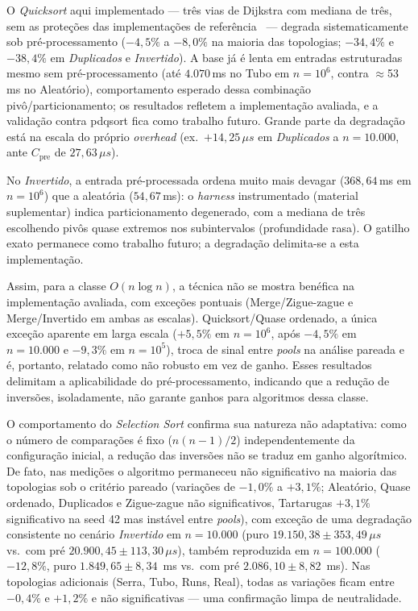 \documentclass[portuguese]{sbc2025}%
\begin{document}
O \emph{Quicksort} aqui implementado --- três vias de Dijkstra com mediana de três, sem as proteções das implementações de referência~\citep{bentley_engineering_1993, Musser1997IntrospectiveSA} --- degrada sistematicamente sob pré-processamento ($-4{,}5\%$ a $-8{,}0\%$ na maioria das topologias; $-34{,}4\%$ e $-38{,}4\%$ em \emph{Duplicados} e \emph{Invertido}). A base já é lenta em entradas estruturadas mesmo sem pré-processamento (até $4.070$\,ms no Tubo em $n{=}10^6$, contra $\approx$53\,ms no Aleatório), comportamento esperado dessa combinação pivô/particionamento; os resultados refletem a implementação avaliada, e a validação contra pdqsort fica como trabalho futuro. Grande parte da degradação está na escala do próprio \emph{overhead} (ex.\ $+14{,}25\,\mu s$ em \emph{Duplicados} a $n{=}10.000$, ante $C_{\text{pre}}$ de $27{,}63\,\mu s$).

No \emph{Invertido}, a entrada pré-processada ordena muito mais devagar ($368{,}64$\,ms em $n{=}10^6$) que a aleatória ($54{,}67$\,ms): o \emph{harness} instrumentado (material suplementar) indica particionamento degenerado, com a mediana de três escolhendo pivôs quase extremos nos subintervalos (profundidade rasa). O gatilho exato permanece como trabalho futuro; a degradação delimita-se a esta implementação.

Assim, para a classe $O(n\log n)$, a técnica não se mostra benéfica na implementação avaliada, com exceções pontuais (Merge/Zigue-zague e Merge/Invertido em ambas as escalas). Quicksort/Quase ordenado, a única exceção aparente em larga escala ($+5{,}5\%$ em $n{=}10^6$, após $-4{,}5\%$ em $n{=}10.000$ e $-9{,}3\%$ em $n{=}10^5$), troca de sinal entre \emph{pools} na análise pareada e é, portanto, relatado como não robusto em vez de ganho. Esses resultados delimitam a aplicabilidade do pré-processamento, indicando que a redução de inversões, isoladamente, não garante ganhos para algoritmos dessa classe.

O comportamento do \emph{Selection Sort} confirma sua natureza não adaptativa: como o número de comparações é fixo ($n(n-1)/2$) independentemente da configuração inicial, a redução das inversões não se traduz em ganho algorítmico. De fato, nas medições o algoritmo permaneceu não significativo na maioria das topologias sob o critério pareado (variações de $-1{,}0\%$ a $+3{,}1\%$; Aleatório, Quase ordenado, Duplicados e Zigue-zague não significativos, Tartarugas $+3{,}1\%$ significativo na seed 42 mas instável entre \emph{pools}), com exceção de uma degradação consistente no cenário \emph{Invertido} em $n=10.000$ (puro $19.150{,}38\pm353{,}49\,\mu s$ vs.\ com pré $20.900{,}45\pm113{,}30\,\mu s$), também reproduzida em $n=100.000$ ($-12{,}8\%$, puro $1.849{,}65\pm8{,}34$~ms vs.\ com pré $2.086{,}10\pm8{,}82$~ms). Nas topologias adicionais (Serra, Tubo, Runs, Real), todas as variações ficam entre $-0{,}4\%$ e $+1{,}2\%$ e não significativas --- uma confirmação limpa de neutralidade.
\end{document}
